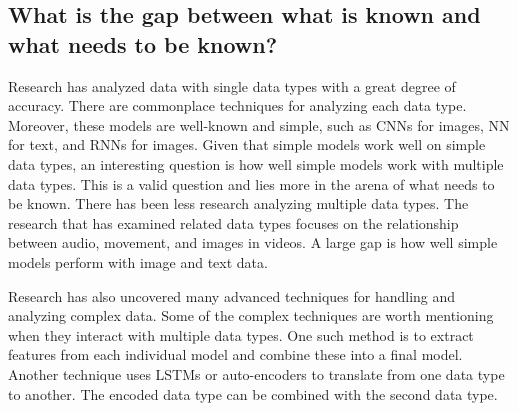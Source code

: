 \subsection{What is the gap between what is known and what needs to be known?}

Research has analyzed data with single data types with a great degree of accuracy. There are commonplace techniques for analyzing each data type.  Moreover, these models are well-known and simple, such as CNNs for images, NN for text, and RNNs for images. Given that simple models work well on simple data types, an interesting question is how well simple models work with multiple data types.  This is a valid question and lies more in the arena of what needs to be known.  There has been less research analyzing multiple data types.  The research that has examined related data types focuses on the relationship between audio, movement, and images in videos.  A large gap is how well simple models perform with image and text data.

Research has also uncovered many advanced techniques for handling and analyzing complex data. Some of the complex techniques are worth mentioning when they interact with multiple data types. One such method is to extract features from each individual model and combine these into a final model.  Another technique uses LSTMs or auto-encoders to translate from one data type to another.  The encoded data type can be combined with the second data type.  


